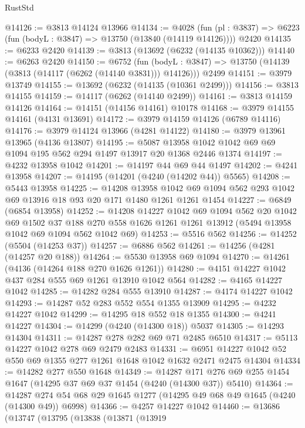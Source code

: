\begin{lexlean}{RustStd}
\begin{coremodule}
@14126 := @3813 @14124 @13966
@14134 := @4028
    (fun (pl : @3837) => @6223 (fun (bodyL : @3847) => @13750 (@13840 (@14119 @14126))))
    @2420
@14135 := @6233 @2420
@14139 := @3813 (@13692 (@6232 (@14135 @10362)))
@14140 := @6263 @2420
@14150 := @6752
    (fun (bodyL : @3847) => @13750 (@14139 (@3813 (@14117 (@6262 (@14140 @3831))) @14126)))
    @2499
@14151 := @3979 @13749
@14155 := @13692 (@6232 (@14135 (@10361 @2499)))
@14156 := @3813 @14155
@14159 := @14117 (@6262 (@14140 @2499))
@14161 := @3813 @14159 @14126
@14164 := @14151 (@14156 @14161) @10178
@14168 := @3979 @14155 @14161 (@4131 @13691)
@14172 := @3979 @14159 @14126 (@6789 @14116)
@14176 := @3979 @14124 @13966 (@4281 @14122)
@14180 := @3979 @13961 @13965 (@4136 @13807)
@14195 := @5087 @13958 @1042 @1042 @69 @69 @1094 @195 @562 @294 @1497 @13917 @20 @1368 @2446 @1374
@14197 := @4232 @13958 @1042
@14201 := @14197 @44 @69 @44 @1497
@14202 := @4241 @13958
@14207 := @14195 (@14201 (@4240 (@14202 @44)) @5565)
@14208 := @5443 @13958
@14225 := @14208
    @13958
    @1042
    @69
    @1094
    @562
    @293
    @1042
    @69
    @13916
    @18
    @93
    @20
    @171
    @1480
    @1261
    @1261
    @1454
@14227 := @6849 (@6854 @13958)
@14252 := @14208
    @14227
    @1042
    @69
    @1094
    @562
    @20
    @1042
    @69
    @1502
    @37
    @188
    @270
    @558
    @1626
    @1261
    @1261
    @13912
    (@5494 @13958 @1042 @69 @1094 @562 @1042 @69)
@14253 := @5516 @562
@14256 := @14252 (@5504 (@14253 @37))
@14257 := @6886 @562
@14261 := @14256 (@4281 (@14257 @20 @188))
@14264 := @5530 @13958 @69 @1094
@14270 := @14261 (@4136 (@14264 @188 @270 @1626 @1261))
@14280 := @4151 @14227 @1042 @437 @284 @555 @69 @1261 @13910 @1042 @564
@14282 := @4165 @14227 @1042
@14285 := @14282 @284 @555 @13910
@14287 := @4174 @14227 @1042
@14293 := @14287 @52 @283 @552 @554 @1355 @13909
@14295 := @4232 @14227 @1042
@14299 := @14295 @18 @552 @18 @1355
@14300 := @4241 @14227
@14304 := @14299 (@4240 (@14300 @18)) @5037
@14305 := @14293 @14304
@14311 := @14287 @278 @282 @69 @71 @2485 @6510
@14317 := @5113 @14227 @1042 @278 @69 @2479 @2483
@14331 := @6951 @14227 @1042 @52 @550 @69 @1355 @277 @1261 @1648 @1042 @1632 @2471 @2475 @14304
@14334 := @14282 @277 @550 @1648
@14349 := @14287
    @171
    @276
    @69
    @255
    @1454
    @1647
    (@14295 @37 @69 @37 @1454 (@4240 (@14300 @37)) @5410)
@14364 := @14287 @274 @54 @68 @29 @1645 @1277 (@14295 @49 @68 @49 @1645 (@4240 (@14300 @49)) @6998)
@14366 := @4257 @14227 @1042
@14460 := @13686
    (@13747
      (@13795
        (@13838
          (@13871
            (@13919

\end{coremodule}
\end{lexlean}
